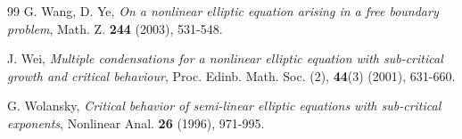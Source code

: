 \documentclass[10pt]{amsart}
\begin{document}
\begin{thebibliography}{99}
 G. Wang, D. Ye, {\em On a nonlinear elliptic equation arising in a free
boundary problem}, Math. Z. {\bf 244}  (2003), 531-548.

 J. Wei, {\em Multiple condensations for a nonlinear elliptic equation with sub-critical growth and critical behaviour},
Proc. Edinb. Math. Soc. (2), {\bf 44}(3) (2001), 631-660.

 G. Wolansky, {\em Critical behavior of semi-linear elliptic equations with
sub-critical exponents}, Nonlinear Anal. {\bf 26}  (1996), 971-995.



\end{thebibliography}
\end{document}
